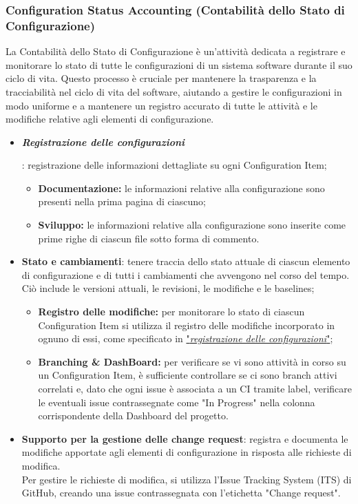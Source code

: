 \subsubsection{Configuration Status Accounting (Contabilità dello Stato di Configurazione)}
La Contabilità dello Stato di Configurazione è un'attività dedicata a registrare e monitorare lo stato di tutte le configurazioni di un sistema software durante il suo ciclo di vita. Questo processo è cruciale per mantenere la trasparenza e la tracciabilità nel ciclo di vita del software, aiutando a gestire le configurazioni in modo uniforme e a mantenere un registro accurato di tutte le attività e le modifiche relative agli elementi di configurazione.\\

\begin{itemize}
    \item \hypertarget{item:registrazioneconfigurazioni}{\textit{\textbf{Registrazione delle configurazioni}}}: registrazione delle informazioni dettagliate su ogni Configuration Item;
          \begin{itemize}
              \item  \textbf{Documentazione:} le informazioni relative alla configurazione sono presenti nella prima pagina di ciascuno;
              \item  \textbf{Sviluppo:} le informazioni relative alla configurazione sono inserite come prime righe di ciascun file sotto forma di commento.
          \end{itemize}
    \item \textbf{Stato e cambiamenti}: tenere traccia dello stato attuale di ciascun elemento di configurazione e di tutti i cambiamenti che avvengono nel corso del tempo. \\
    Ciò include le versioni attuali, le revisioni, le modifiche e le baselines;
        \begin{itemize}
            \item \textbf{Registro delle modifiche:} per monitorare lo stato di ciascun Configuration Item si utilizza il registro delle modifiche incorporato in ognuno di essi, come specificato in \hyperlink{item:registrazioneconfigurazioni}{"\textit{registrazione delle configurazioni}"};
            \item \textbf{Branching \& DashBoard:} per verificare se vi sono attività in corso su un Configuration Item, è sufficiente controllare se ci sono branch attivi correlati e, dato che ogni issue è associata a un CI tramite label, verificare le eventuali issue contrassegnate come "In Progress" nella colonna corrispondente della Dashboard del progetto.
        \end{itemize}
    \item \textbf{Supporto per la gestione delle change request}: registra e documenta le modifiche apportate agli elementi di configurazione in risposta alle richieste di modifica. \\
    Per gestire le richieste di modifica, si utilizza l'Issue Tracking System (ITS) di GitHub, creando una issue contrassegnata con l'etichetta "Change request".
\end{itemize}

